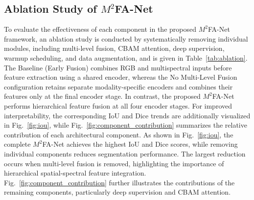 \documentclass[pdflatex,sn-mathphys-num]{sn-jnl}
\begin{document}
\subsection{Ablation Study of
\texorpdfstring{$M^2$FA-Net}{M2FA-Net}}
To evaluate the effectiveness of each component in the proposed $M^2$FA-Net framework, an ablation study is conducted by systematically removing individual modules, including multi-level fusion, CBAM attention, deep supervision, warmup scheduling, and data augmentation, and is given in Table~\ref{tab:ablation}. The Baseline (Early Fusion) combines RGB and multispectral inputs before feature extraction using a shared encoder, whereas the No Multi-Level Fusion configuration retains separate modality-specific encoders and combines their features only at the final encoder stage. In contrast, the proposed $M^2$FA-Net performs hierarchical feature fusion at all four encoder stages. For improved interpretability, the corresponding IoU and Dice
trends are additionally visualized in Fig.~\ref{fig:iou}, while
Fig.~\ref{fig:component_contribution} summarizes the relative
contribution of each architectural component.
As shown in Fig.~\ref{fig:iou}, the complete
$M^2$FA-Net achieves the highest IoU and Dice scores,
while removing individual components reduces
segmentation performance. The largest reduction
occurs when multi-level fusion is removed,
highlighting the importance of hierarchical
spatial-spectral feature integration.
Fig.~\ref{fig:component_contribution} further
illustrates the contributions of the remaining
components, particularly deep supervision
and CBAM attention.
\end{document}
